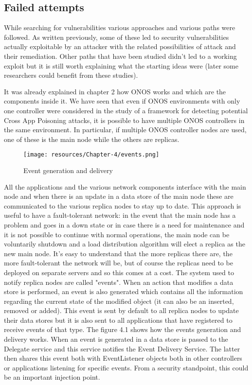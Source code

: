 
\subsection{Failed attempts}
While searching for vulnerabilities various approaches and various paths were followed. As written previously, some of these led to security vulnerabilities actually exploitable by an attacker with the related possibilities of attack and their remediation. Other paths that have been studied didn't led to a working exploit but it is still worth explaining what the starting ideas were (later some researchers could benefit from these studies). 

It was already explained in chapter 2 how ONOS works and which are the components inside it. We have seen that even if ONOS environments with only one controller were considered in the study of a framework for detecting potential Cross App Poisoning attacks, it is possible to have multiple ONOS controllers in the same environment. In particular, if multiple ONOS controller nodes are used, one of these is the main node while the others are replicas. 
\begin{wrapfigure}[23]{l}{0.70\textwidth}
\caption{Event generation and delivery}
\label{fig:events}
\texttt{[image: resources/Chapter-4/events.png]}
\end{wrapfigure}
All the applications and the various network components interface with the main node and when there is an update in a data store of the main node these are communicated to the various replica nodes to stay up to date. This approach is useful to have a fault-tolerant network: in the event that the main node has a problem and goes in a down state or in case there is a need for maintenance and it is not possible to continue with normal operations, the main node can be voluntarily shutdown and a load distribution algorithm will elect a replica as the new main node. It's easy to understand that the more replicas there are, the more fault-tolerant the network will be, but of course the replicas need to be deployed on separate servers and so this comes at a cost. The system used to notify replica nodes are called "events". When an action that modifies a data store is performed, an event is also generated which contains all the information regarding the current state of the modified object (it can also be an inserted, removed or added). This event is sent by default to all replica nodes to update their data stores but it is also sent to all applications that have registered to receive events of that type. The figure 4.1 shows how the events generation and delivery works. When an event is generated in a data store is passed to the Delegate service and this service notifies the Event Delivery Service. The latter then shares this event both with EventListener objects both in other controllers or applications listening for specific events. From a security standpoint, this could be an important injection point.

